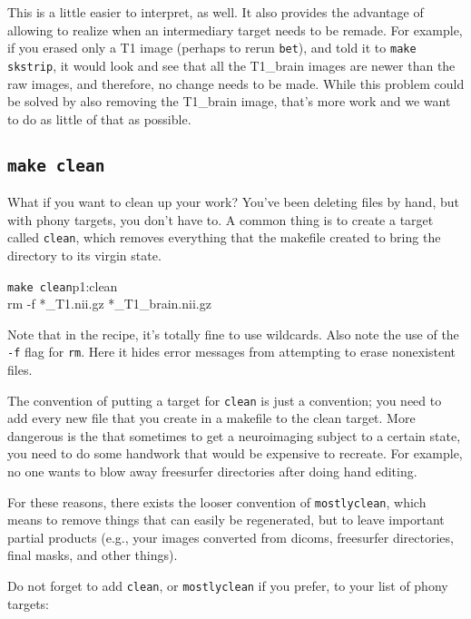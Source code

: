 This is a little easier to interpret, as well. It also provides the advantage of allowing \maken{} to realize when an intermediary target needs to be remade. For example, if you erased only a T1 image (perhaps to rerun \texttt{bet}), and told it to \texttt{make skstrip}, it would look and see that all the T1_brain images are newer than the raw images, and therefore, no change needs to be made. While this problem could be solved by also removing the T1_brain image, that's more work and we want to do as little of that as possible.

\subsection{\texttt{make clean}}

What if you want to clean up your work? You've been deleting files by hand, but with phony targets, you don't have to. A common thing is to create a target called \texttt{clean}, which removes everything that the makefile created to bring the directory to its virgin state.

\begin{make}{\texttt{make clean}}{p1:clean}
	\\
	\tab rm -f *_T1.nii.gz *_T1_brain.nii.gz
\end{make}

Note that in the recipe, it's totally fine to use wildcards. Also note the use of the \texttt{-f} flag for \texttt{rm}. Here it hides error messages from attempting to erase nonexistent files. 

The convention of putting a target for \texttt{clean} is just a convention; you need to add every new file that you create in a makefile to the clean target. More dangerous is the that sometimes to get a neuroimaging subject to a certain state, you need to do some handwork that would be expensive to recreate. For example, no one wants to blow away freesurfer directories after doing hand editing. 

For these reasons, there exists the looser convention of \texttt{mostlyclean}, which means to remove things that can easily be regenerated, but to leave important partial products (e.g., your images converted from dicoms, freesurfer directories, final masks, and other things).

Do not forget to add \texttt{clean}, or \texttt{mostlyclean} if you prefer, to your list of phony targets:
